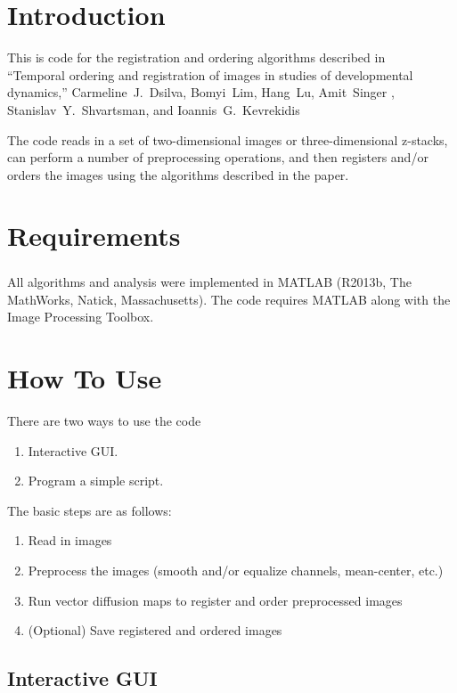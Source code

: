 \documentclass[12pt]{article}
\begin{document}
\section{Introduction}

This is code for the registration and ordering algorithms described in \\
``Temporal ordering and registration of images in studies of developmental dynamics,'' Carmeline~J.~Dsilva, Bomyi~Lim, Hang~Lu, Amit~Singer , Stanislav~Y.~Shvartsman, and Ioannis~G.~Kevrekidis

The code reads in a set of two-dimensional images or three-dimensional z-stacks, can perform a number of preprocessing operations, and then registers and/or orders the images using the algorithms described in the paper. 

\section{Requirements}

All algorithms and analysis were implemented in MATLAB\textsuperscript{\textregistered} (R2013b, The MathWorks, Natick, Massachusetts).
%
The code requires MATLAB along with the Image Processing Toolbox. 

\section{How To Use}

There are two ways to use the code
\begin{enumerate}
\item Interactive GUI.
\item Program a simple script.
\end{enumerate}

The basic steps are as follows:
\begin{enumerate}
   \item Read in images
   \item Preprocess the images (smooth and/or equalize channels, mean-center, etc.)
   \item Run vector diffusion maps to register and order preprocessed images
   \item (Optional) Save registered and ordered images
\end{enumerate}

\subsection{Interactive GUI}
\end{document}
